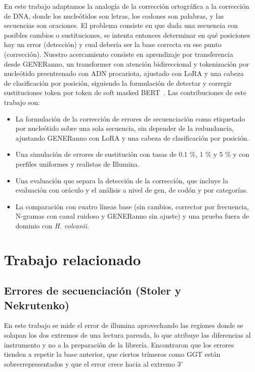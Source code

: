 \documentclass[sigconf,nonacm]{acmart}
\begin{document}
En este trabajo adaptamos la analogía de la corrección ortográfica a la corrección de DNA, donde los nucleótidos son letras, los codones son palabras, y las secuencias son oraciones. El problema consiste en que dada una secuencia con posibles cambios o sustituciones, se intenta entonces determinar en qué posiciones hay un error (detección) y cual debería ser la base correcta en ese punto (corrección). Nuestro acercamiento consiste en aprendizaje por transferencia desde GENERanno, un transformer con atención bidireccional y tokenización por nucleótido preentrenado con ADN procariota, ajustado con LoRA y una cabeza de clasificación por posición, siguiendo la formulación de detectar y corregir sustituciones token por token de soft masked BERT~\cite{zhang2020spelling}. Las contribuciones de este trabajo son:
\begin{itemize}
  \item La formulación de la corrección de errores de secuenciación como etiquetado por nucleótido sobre una sola secuencia, sin depender de la redundancia, ajustando GENERanno con LoRA y una cabeza de clasificación por posición.
  \item Una simulación de errores de sustitución con tasas de 0.1 \%, 1 \% y 5 \% y con perfiles uniformes y realistas de Illumina.
  \item Una evaluación que separa la detección de la corrección, que incluye la evaluación con oráculo y el análisis a nivel de gen, de codón y por categorías.
  \item La comparación con cuatro líneas base (sin cambios, corrector por frecuencia, N-gramas con canal ruidoso y GENERanno sin ajuste) y una prueba fuera de dominio con \emph{H. volcanii}.
\end{itemize}

\section{Trabajo relacionado}\label{sec:trabajo-relacionado}

\subsection{\texorpdfstring{Errores de secuenciación (Stoler y Nekrutenko)~\cite{stoler2021sequencing}}{Errores de secuenciación (Stoler y Nekrutenko)}}

En este trabajo se mide el error de illumina aprovechando las regiones donde se solapan los dos extremos de una lectura pareada, lo que atribuye las diferencias al instrumento y no a la preparación de la librería. Encontraron que los errores tienden a repetir la base anterior, que ciertos trímeros como GGT están sobrerrepresentados y que el error crece hacia al extremo 3'
\end{document}
